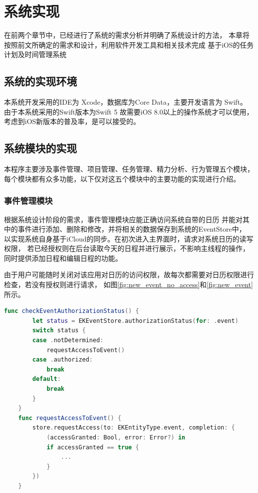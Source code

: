 
\chapter{系统实现}

在前两个章节中，已经进行了系统的需求分析并明确了系统设计的方法，
本章将按照前文所确定的需求和设计，利用软件开发工具和相关技术完成
基于iOS的任务计划及时间管理系统

\section{系统的实现环境}
本系统开发采用的IDE为 Xcode，数据库为Core Data，主要开发语言为 Swift。
由于本系统采用的Swift版本为Swift 5 故需要iOS 8.0以上的操作系统才可以使用， \parencite{wals2018mastering}
考虑到iOS新版本的普及率，是可以接受的。

\section{系统模块的实现}
本程序主要涉及事件管理、项目管理、任务管理、精力分析、行为管理五个模块，
每个模块都有众多功能，以下仅对这五个模块中的主要功能的实现进行介绍。

\subsection{事件管理模块}
根据系统设计阶段的需求，事件管理模块应能正确访问系统自带的日历
并能对其中的事件进行添加、删除和修改，并将相关的数据保存到系统的EventStore中，
以实现系统自身基于iCloud的同步。在初次进入主界面时，请求对系统日历的读写权限，
若已经授权则在后台读取今天的日程并进行展示，不影响主线程的操作，同时提供添加日程和编辑日程的功能。

由于用户可能随时关闭对该应用对日历的访问权限，故每次都需要对日历权限进行检查，若没有授权则进行请求，
如图\ref{fig:new_event_no_access}和\ref{fig:new_event}所示。

\begin{lstlisting}[language={Swift}, caption={请求日历权限代码逻辑}]
	func checkEventAuthorizationStatus() {
		let status = EKEventStore.authorizationStatus(for: .event)
		switch status {
		case .notDetermined:
			requestAccessToEvent()
		case .authorized:
			break
		default:
			break
		}
	}
	func requestAccessToEvent() {
		store.requestAccess(to: EKEntityType.event, completion: {
			(accessGranted: Bool, error: Error?) in
			if accessGranted == true {
				...
			}
		})
	}
\end{lstlisting}

